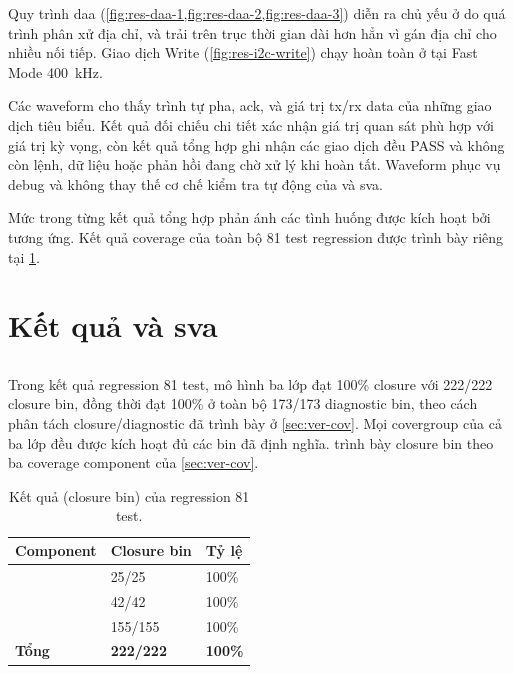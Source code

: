Quy trình \gls{daa} (\cref{fig:res-daa-1,fig:res-daa-2,fig:res-daa-3}) diễn ra chủ
yếu ở \OpenDrain{} do quá trình phân xử địa chỉ, và trải trên trục thời gian dài hơn hẳn vì gán
địa chỉ cho nhiều \Target{} nối tiếp. Giao dịch \LegacyIic{} Write
(\cref{fig:res-i2c-write}) chạy hoàn toàn ở \OpenDrain{} tại Fast Mode 400~kHz.

Các waveform cho thấy trình tự pha, \gls{ack}, \TBit{} và giá trị \gls{tx}/\gls{rx} data của những giao dịch
tiêu biểu. Kết quả đối chiếu chi tiết xác nhận giá trị quan sát phù hợp với giá trị kỳ vọng, còn
kết quả tổng hợp ghi nhận các giao dịch đều PASS và không còn lệnh, dữ liệu hoặc phản hồi đang chờ
xử lý khi \VirtualSequence{} hoàn tất. Waveform phục vụ debug và không thay thế cơ chế kiểm tra tự
động của \Scoreboard{} và \gls{sva}.

Mức \FunctionalCoverage{} trong từng kết quả tổng hợp phản ánh các tình huống được kích hoạt bởi
\VirtualSequence{} tương ứng. Kết quả coverage của toàn bộ 81 test regression được trình bày riêng
tại \cref{sec:res-coverage}.

\section{Kết quả \FunctionalCoverage{} và \texorpdfstring{\gls{sva}}{SVA}}
\label{sec:res-coverage}

\subsection{\FunctionalCoverage{}}

Trong kết quả regression 81 test, mô hình ba lớp đạt 100\% closure
với 222/222 closure bin, đồng thời đạt 100\% ở toàn bộ 173/173 diagnostic bin, theo cách phân tách
closure/diagnostic đã trình bày ở \cref{sec:ver-cov}. Mọi covergroup của cả ba lớp đều được kích
hoạt đủ các bin đã định nghĩa.  trình bày closure bin theo ba coverage component
của \cref{sec:ver-cov}.

\begin{table}[!htbp]
	\centering
	\caption{Kết quả \FunctionalCoverage{} (closure bin) của regression 81 test.}
	\label{tab:res-cov}
	\begin{tabular}{L{5.6cm} C{3.0cm} C{2.4cm}}
		\toprule
		\textbf{Component}    & \textbf{Closure bin} & \textbf{Tỷ lệ} \\
		\midrule
		\RegisterCoverage{}   & 25/25                & 100\%          \\
		\IThreeCCoverage{}    & 42/42                & 100\%          \\
		\CorrelatedCoverage{} & 155/155              & 100\%          \\
		\midrule
		\textbf{Tổng}         & \textbf{222/222}     & \textbf{100\%} \\
		\bottomrule
	\end{tabular}
\end{table}

